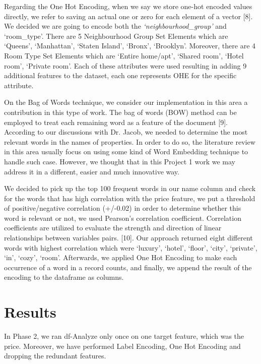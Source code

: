 \documentclass[a4paper,12pt]{article}
\begin{document}
Regarding the One Hot Encoding, when we say we store one-hot encoded values directly, we refer to saving an actual one or zero for each element of a vector [8]. We decided we are going to encode both the \textit{`neighbourhood\_group' } and `room\_type'. There are 5 Neighbourhood Group Set Elements which are `Queens', `Manhattan', `Staten Island', `Bronx', `Brooklyn'. Moreover, there are 4 Room Type Set Elements which are `Entire home/apt', `Shared room', `Hotel room', `Private room'. Each of these attributes were used resulting in adding 9 additional features to the dataset, each one represents OHE for the specific attribute. \newline

On the Bag of Words technique, we consider our implementation in this area a contribution in this type of work. The bag of words (BOW) method can be employed to treat each remaining word as a feature of the document [9]. According to our discussions with Dr. Jacob, we needed to determine the most relevant words in the names of properties. In order to do so, the literature review in this area usually focus on using some kind of Word Embedding technique to handle such case. However, we thought that in this Project 1 work we may address it in a different, easier and much innovative way.

We decided to pick up the top 100 frequent words in our name column and check for the words that has high correlation with the price feature, we put a threshold of positive/negative correlation (+/-0.02) in order to determine whether this word is relevant or not, we used Pearson's correlation coefficient. Correlation coefficients are utilized to evaluate the strength and direction of linear relationships between variables pairs. [10]. Our approach returned eight different words with highest correlation which were `luxury', `hotel', `floor', `city', `private', `in', `cozy', `room'. Afterwards, we applied One Hot Encoding to make each occurrence of a word in a record counts, and finally, we append the result of the encoding to the dataframe as columns.

\section*{Results}

In Phase 2, we ran df-Analyze only once on one target feature, which was the price. Moreover, we have performed Label Encoding, One Hot Encoding and dropping the redundant features.
\end{document}
